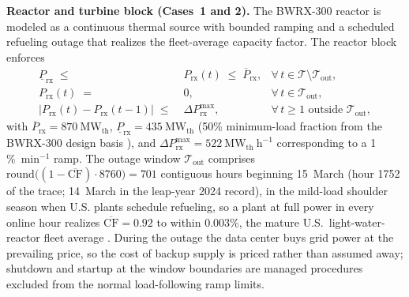 \documentclass[sn-vancouver,Numbered]{sn-jnl}%
\newcommand{\runinhead}[1]{\par\smallskip\noindent\textbf{#1.}\quad}
\begin{document}
\runinhead{Reactor and turbine block (Cases~1 and 2)}
The BWRX-300 reactor is modeled as a continuous thermal source with bounded ramping and a scheduled refueling outage that realizes the fleet-average capacity factor. The reactor block enforces
\begin{align}
\underline{P}_{\mathrm{rx}} \;\le\; & P_{\mathrm{rx}}(t) \;\le\; \overline{P}_{\mathrm{rx}}, &\forall\, t \in \mathcal{T}\setminus\mathcal{T}_{\mathrm{out}}, \label{eq:rx_bounds}\\
P_{\mathrm{rx}}(t) \;=\; & 0, &\forall\, t \in \mathcal{T}_{\mathrm{out}}, \label{eq:rx_outage}\\
\big|P_{\mathrm{rx}}(t) - P_{\mathrm{rx}}(t-1)\big| \;\le\; & \Delta P_{\mathrm{rx}}^{\max}, &\forall\, t \ge 1 \text{ outside } \mathcal{T}_{\mathrm{out}}, \label{eq:rx_ramp}
\end{align}
with $\overline{P}_{\mathrm{rx}}=870~\mathrm{MW}_{\mathrm{th}}$, $\underline{P}_{\mathrm{rx}}=435~\mathrm{MW}_{\mathrm{th}}$ (50\% minimum-load fraction from the BWRX-300 design basis \citep{gehitachi2024bwrx300}), and $\Delta P_{\mathrm{rx}}^{\max}=522~\mathrm{MW}_{\mathrm{th}}~\mathrm{h}^{-1}$ corresponding to a 1\,\%~min$^{-1}$ ramp. The outage window $\mathcal{T}_{\mathrm{out}}$ comprises $\mathrm{round}\!\big((1-\overline{\mathrm{CF}})\cdot 8760\big) = 701$ contiguous hours beginning 15~March (hour 1752 of the trace; 14~March in the leap-year 2024 record), in the mild-load shoulder season when U.S. plants schedule refueling, so a plant at full power in every online hour realizes $\overline{\mathrm{CF}}=0.92$ to within 0.003\%, the mature U.S.\ light-water-reactor fleet average \citep{eia2025capacityfactors}. During the outage the data center buys grid power at the prevailing price, so the cost of backup supply is priced rather than assumed away; shutdown and startup at the window boundaries are managed procedures excluded from the normal load-following ramp limits.
\end{document}
